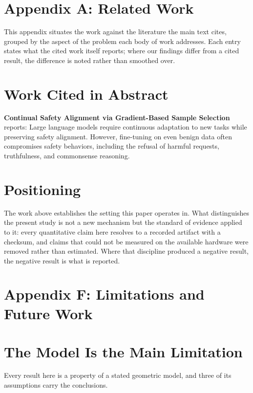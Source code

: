 \documentclass[10pt,twocolumn,letterpaper]{article}
\begin{document}
\section{Appendix A: Related Work}


This appendix situates the work against the literature the main text cites, grouped by the aspect of the problem each body of work addresses. Each entry states what the cited work itself reports; where our findings differ from a cited result, the difference is noted rather than smoothed over.


\section{Work Cited in Abstract}


\textbf{Continual Safety Alignment via Gradient-Based Sample Selection} \cite{arxiv_2604_17215} reports: Large language models require continuous adaptation to new tasks while preserving safety alignment. However, fine-tuning on even benign data often compromises safety behaviors, including the refusal of harmful requests, truthfulness, and commonsense reasoning.


\section{Positioning}


The work above establishes the setting this paper operates in. What distinguishes the present study is not a new mechanism but the standard of evidence applied to it: every quantitative claim here resolves to a recorded artifact with a checksum, and claims that could not be measured on the available hardware were removed rather than estimated. Where that discipline produced a negative result, the negative result is what is reported.





\section{Appendix F: Limitations and Future Work}



\section{The Model Is the Main Limitation}


Every result here is a property of a stated geometric model, and three of its assumptions carry the conclusions.
\end{document}
